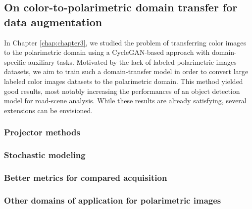 \subsection*{On color-to-polarimetric domain transfer for data augmentation}

In Chapter \ref{chap:chapter3}, we studied the problem of transferring color images to the polarimetric domain using a CycleGAN-based approach with domain-specific auxiliary tasks. Motivated by the lack of labeled polarimetric images datasets, we aim to train such a domain-transfer model in order to convert large labeled color images datasets to the polarimetric domain.  This method yielded good results, most notably increasing the performances of an object detection model for road-scene analysis. While these results are already satisfying, several extensions can be envisioned.

\subsubsection*{Projector methods}



\subsubsection*{Stochastic modeling}

\subsubsection*{Better metrics for compared acquisition}

\subsubsection*{Other domains of application for polarimetric images}
	